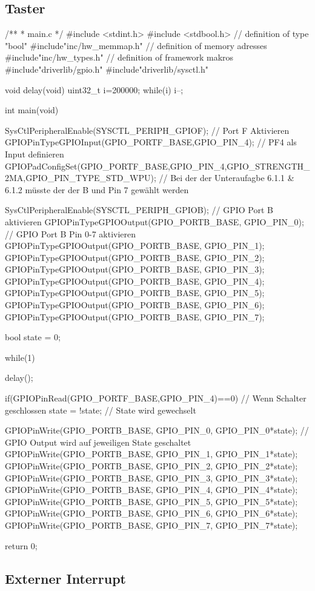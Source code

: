\subsection{Taster}

/**
 * main.c
 */
 #include <stdint.h>
 #include <stdbool.h>                                           // definition of type "bool"
 #include"inc/hw_memmap.h"                                      // definition of memory adresses
 #include"inc/hw_types.h"                                        // definition of framework makros
 #include"driverlib/gpio.h"
 #include"driverlib/sysctl.h"

void delay(void)
{
  uint32_t i=200000;
  while(i) {i--;}
 }


int main(void){

    SysCtlPeripheralEnable(SYSCTL_PERIPH_GPIOF);                // Port F Aktivieren
    GPIOPinTypeGPIOInput(GPIO_PORTF_BASE,GPIO_PIN_4);           // PF4 als Input definieren
    GPIOPadConfigSet(GPIO_PORTF_BASE,GPIO_PIN_4,GPIO_STRENGTH_2MA,GPIO_PIN_TYPE_STD_WPU);
    // Bei der der Unteraufagbe 6.1.1 & 6.1.2 müsste der der B und Pin 7 gewählt werden

    SysCtlPeripheralEnable(SYSCTL_PERIPH_GPIOB);                // GPIO Port B aktivieren
    GPIOPinTypeGPIOOutput(GPIO_PORTB_BASE, GPIO_PIN_0);         // GPIO Port B Pin 0-7 aktivieren
    GPIOPinTypeGPIOOutput(GPIO_PORTB_BASE, GPIO_PIN_1);
    GPIOPinTypeGPIOOutput(GPIO_PORTB_BASE, GPIO_PIN_2);
    GPIOPinTypeGPIOOutput(GPIO_PORTB_BASE, GPIO_PIN_3);
    GPIOPinTypeGPIOOutput(GPIO_PORTB_BASE, GPIO_PIN_4);
    GPIOPinTypeGPIOOutput(GPIO_PORTB_BASE, GPIO_PIN_5);
    GPIOPinTypeGPIOOutput(GPIO_PORTB_BASE, GPIO_PIN_6);
    GPIOPinTypeGPIOOutput(GPIO_PORTB_BASE, GPIO_PIN_7);

    bool state = 0;

   while(1)
   {
       delay();

       if(GPIOPinRead(GPIO_PORTF_BASE,GPIO_PIN_4)==0)               // Wenn Schalter geschlossen
       {
          state = !state;                                           // State wird gewechselt
       }

       GPIOPinWrite(GPIO_PORTB_BASE, GPIO_PIN_0, GPIO_PIN_0*state); // GPIO Output wird auf jeweiligen State geschaltet
       GPIOPinWrite(GPIO_PORTB_BASE, GPIO_PIN_1, GPIO_PIN_1*state);
       GPIOPinWrite(GPIO_PORTB_BASE, GPIO_PIN_2, GPIO_PIN_2*state);
       GPIOPinWrite(GPIO_PORTB_BASE, GPIO_PIN_3, GPIO_PIN_3*state);
       GPIOPinWrite(GPIO_PORTB_BASE, GPIO_PIN_4, GPIO_PIN_4*state);
       GPIOPinWrite(GPIO_PORTB_BASE, GPIO_PIN_5, GPIO_PIN_5*state);
       GPIOPinWrite(GPIO_PORTB_BASE, GPIO_PIN_6, GPIO_PIN_6*state);
       GPIOPinWrite(GPIO_PORTB_BASE, GPIO_PIN_7, GPIO_PIN_7*state);
   }
    return 0;
}

\subsection{Externer Interrupt}

